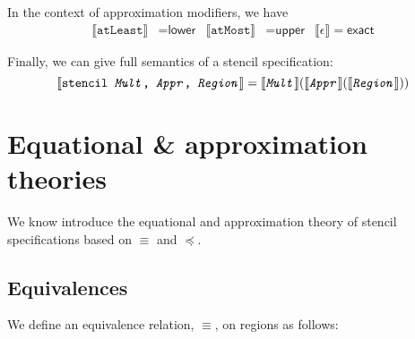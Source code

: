 \documentclass{article}
\theoremstyle{definition}
\theoremstyle{plain}
\newcommand{\interp}[1]{\llbracket {#1} \rrbracket}
\newcommand{\textcap}[1]{\texttt{\textit{#1}}}
\begin{document}
In the context of approximation modifiers, we have
%
\begin{align*}
  \interp{\texttt{atLeast}} & = \textsf{lower} &
  \interp{\texttt{atMost}} & = \textsf{upper} &
  \llbracket \epsilon \rrbracket = \textsf{exact}
\end{align*}

Finally, we can give full semantics of a stencil specification:
%
\begin{equation*}
  \interp{\texttt{stencil \textcap{Mult}, \textcap{Appr}, \textcap{Region}}} =
    \interp{\textcap{Mult}}
           {(\interp{\textcap{Appr}}
                    {(\interp{\textcap{Region}})})}
\end{equation*}

\section{Equational \& approximation theories}

We know introduce the equational and approximation theory of stencil
specifications based on $\equiv$ and $\preceq$.

\subsection{Equivalences}

We define an equivalence relation, $\equiv$, on regions as follows:
\end{document}
